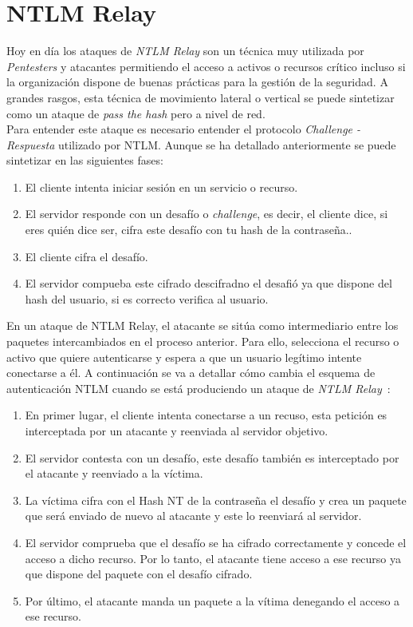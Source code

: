 \begin{enumerate}
\end{enumerate}

\section{NTLM Relay}

Hoy en día los ataques de {\it NTLM Relay} son un técnica muy utilizada por {\it Pentesters} y atacantes permitiendo el acceso a activos o recursos crítico incluso si la organización dispone de buenas prácticas para la gestión de la seguridad. A grandes rasgos, esta técnica de movimiento lateral o vertical se puede sintetizar como un ataque de {\it pass the hash} pero a nivel de red. \\ 

Para entender este ataque es necesario entender el protocolo {\it Challenge - Respuesta} utilizado por NTLM. Aunque se ha detallado anteriormente se puede sintetizar en las siguientes fases: 

\begin{enumerate}
\item El cliente intenta iniciar sesión en un servicio o recurso.
\item El servidor responde con un desafío o {\it challenge}, es decir, el cliente dice, si eres quién dice ser, cifra este desafío con tu hash de la contraseña..
\item El cliente cifra el desafío.
\item El servidor compueba este cifrado descifradno el desafió ya que dispone del hash del usuario, si es correcto verifica al usuario. 
\end{enumerate}

En un ataque de NTLM Relay, el atacante se sitúa como intermediario entre los paquetes intercambiados en el proceso anterior. Para ello, selecciona el recurso o activo que quiere autenticarse y espera a que un usuario legítimo intente conectarse a él. A continuación se va a detallar cómo cambia el esquema de autenticación NTLM cuando se está produciendo un ataque de {\it NTLM Relay}~\cite{Capitulo5:NTLMRelay}:

\begin{enumerate}
\item En primer lugar, el cliente intenta conectarse a un recuso, esta petición es interceptada por un atacante y reenviada al servidor objetivo. 
\item El servidor contesta con un desafío, este desafío también es interceptado por el atacante y reenviado a la víctima.
\item La víctima cifra con el Hash NT de la contraseña el desafío y crea un paquete que será enviado de nuevo al atacante y este lo reenviará al servidor. 
\item El servidor comprueba que el desafío se ha cifrado correctamente y concede el acceso a dicho recurso. Por lo tanto, el atacante tiene acceso a ese recurso ya que dispone del paquete con el desafío cifrado. 
\item Por último, el atacante manda un paquete a la vítima denegando el acceso a ese recurso. 
\end{enumerate}

